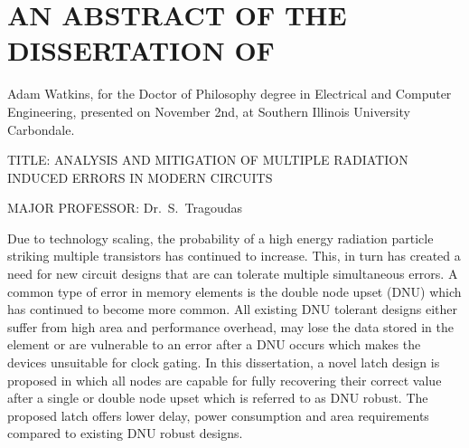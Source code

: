 


\chapter*{AN ABSTRACT OF THE DISSERTATION OF}

Adam Watkins, for the Doctor of Philosophy degree in Electrical and Computer Engineering,
presented on November 2nd, at Southern Illinois University Carbondale.

\vspace{14pt}
\noindent
TITLE: ANALYSIS AND MITIGATION OF MULTIPLE RADIATION INDUCED ERRORS IN MODERN CIRCUITS

\vspace{14pt}

\noindent
MAJOR PROFESSOR: Dr.\ S.\ Tragoudas

\vspace{14pt}

Due to technology scaling, the probability of a high energy radiation particle striking multiple transistors has continued to increase. This, in turn has created a need for new circuit designs that are can tolerate multiple simultaneous errors. A common type of error in memory elements is the double node upset (DNU) which has continued to become more common. All existing DNU tolerant designs either suffer from high area and performance overhead, may lose the data stored in the element or are vulnerable to an error after a DNU occurs which makes the devices unsuitable for clock gating. In this dissertation, a novel latch design is proposed in which all nodes are capable for fully recovering their correct value after a single or double node upset which is referred to as DNU robust. The proposed latch offers lower delay, power consumption and area requirements compared to existing DNU robust designs.

